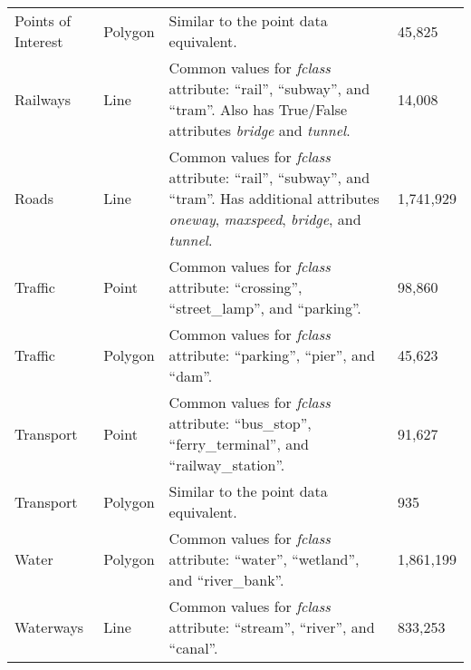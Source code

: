 \begin{longtable}{p{3cm}p{2cm}p{5.7cm}p{2.5cm}}
    Points of Interest & Polygon       & Similar to the point data equivalent.                                                                                                                                                        & 45,825              \\
    Railways           & Line          & Common values for \emph{fclass} attribute: \enquote{rail}, \enquote{subway}, and \enquote{tram}. Also has True/False attributes \emph{bridge} and \emph{tunnel}.                             & 14,008              \\
    Roads              & Line          & Common values for \emph{fclass} attribute: \enquote{rail}, \enquote{subway}, and \enquote{tram}. Has additional attributes \emph{oneway}, \emph{maxspeed}, \emph{bridge}, and \emph{tunnel}. & 1,741,929           \\
    Traffic            & Point         & Common values for \emph{fclass} attribute: \enquote{crossing}, \enquote{street\_lamp}, and \enquote{parking}.                                                                                & 98,860              \\
    Traffic            & Polygon       & Common values for \emph{fclass} attribute: \enquote{parking}, \enquote{pier}, and \enquote{dam}.                                                                                             & 45,623              \\
    Transport          & Point         & Common values for \emph{fclass} attribute: \enquote{bus\_stop}, \enquote{ferry\_terminal}, and \enquote{railway\_station}.                                                                   & 91,627              \\
    Transport          & Polygon       & Similar to the point data equivalent.                                                                                                                                                        & 935                 \\
    Water              & Polygon       & Common values for \emph{fclass} attribute: \enquote{water}, \enquote{wetland}, and \enquote{river\_bank}.                                                                                    & 1,861,199           \\
    Waterways          & Line          & Common values for \emph{fclass} attribute: \enquote{stream}, \enquote{river}, and \enquote{canal}.                                                                                           & 833,253             \\
\end{longtable}
